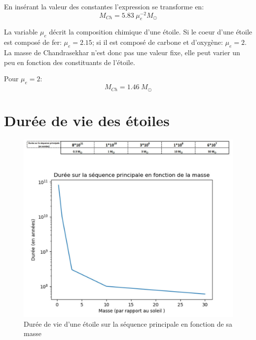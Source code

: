 En insérant la valeur des constantes l'expression se transforme en:
\begin{equation}M_{Ch}=5.83\hspace{3pt}\mu_{e}^{-2}M_\odot\label{Eq. 7.9}\end{equation}

La variable $\mu_{e}$ décrit la composition chimique d'une étoile. Si le coeur d'une étoile est composé de fer: $\mu_{e}=2.15$; si il est composé de carbone et d'oxygène: $\mu_{e}=2$. La masse de Chandrasekhar n'est donc pas une valeur fixe, elle peut varier un peu en fonction des constituants de l'étoile.\bigskip

Pour $\mu_{e}=2$: 
\begin{equation}M_{Ch}=1.46\hspace{3pt}M_\odot\label{Eq. 7.10}\end{equation}

\chapter{Durée de vie des étoiles}\label{Annexe C}
\vspace{1cm}
\begin{figure}[H]
	\centering
	\includegraphics[scale=0.65]{images/duree}
	\caption[Durée de vie d'une étoile en fonction de sa masse - figure réalisée avec Matplotlib]{Durée de vie d'une étoile sur la séquence principale en fonction de sa masse}
	\label{Fig. C.1}
\end{figure}\bigskip

